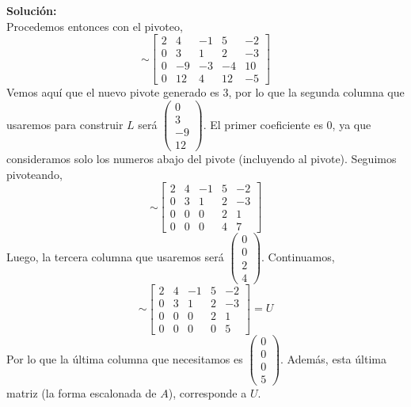 \documentclass[12pt]{article}
\newenvironment{solucion}
{\begin{mdframed}[backgroundcolor=black!10]
		{\bf Solución:}\\
	}
	{
	\end{mdframed}
}
\newenvironment{preguntas}
{\begin{enumerate}\itemsep12pt
	}
	{
	\end{enumerate}
}
\begin{document}
\begin{preguntas}
\begin{solucion}
		Procedemos entonces con el pivoteo,
		$$\sim \begin{bmatrix}
		2 & 4 & -1 & 5 & -2 \\
		0 & 3 & 1 & 2 & -3 \\
		0 & -9 & -3 & -4 & 10 \\
		0 & 12 & 4 & 12 & -5
		\end{bmatrix}$$
		Vemos aquí que el nuevo pivote generado es $3$, por lo que la segunda columna que usaremos para construir $L$ será
		$\begin{pmatrix}
		0\\3\\-9\\12
		\end{pmatrix}$. El primer coeficiente es 0, ya que consideramos solo los numeros abajo del pivote (incluyendo al pivote). Seguimos pivoteando,
		$$\sim \begin{bmatrix}
		2 & 4 & -1 & 5 & -2 \\
		0 & 3 & 1 & 2 & -3 \\
		0 & 0 & 0 & 2 & 1 \\
		0 & 0 & 0 & 4 & 7
		\end{bmatrix}$$
		Luego, la tercera columna que usaremos será
		$\begin{pmatrix}
		0\\0\\2\\4
		\end{pmatrix}$. Continuamos,
		$$\sim \begin{bmatrix}
		2 & 4 & -1 & 5 & -2 \\
		0 & 3 & 1 & 2 & -3 \\
		0 & 0 & 0 & 2 & 1 \\
		0 & 0 & 0 & 0 & 5
		\end{bmatrix} = U$$
		Por lo que la última columna que necesitamos es $\begin{pmatrix}0\\0\\0\\5
		\end{pmatrix}$. Además, esta última matriz (la forma escalonada de $A$), corresponde a $U$.
		

\end{solucion}
\end{preguntas}
\end{document}

